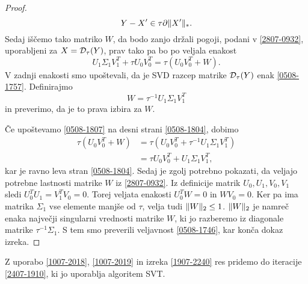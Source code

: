 \begin{proof}
\begin{equation}
    Y- X' \in \tau \partial \lVert X'\rVert_*.
\end{equation}
\fi
Sedaj iščemo tako matriko $W$, da bodo zanjo držali pogoji, podani v \eqref{2807-0932}, uporabljeni za $X=\mathcal{D}_\tau(Y)$, prav tako pa bo po veljala enakost
\begin{equation} \label{0508-1804}
    U_1\Sigma_1V_1^T+\tau U_0 V_0^T
    =
    \tau(U_0V_0^T +W).
\end{equation}
V zadnji enakosti smo upoštevali, da je SVD razcep matrike $\mathcal{D}_\tau(Y)$ enak \eqref{0508-1757}.
Definirajmo
\begin{equation} \label{0508-1807}
    W= \tau^{-1} U_1 \Sigma_1 V_1^T
\end{equation}
in preverimo, da je to prava izbira za $W$.
\iffalse
Veljavnost željene enakosti
preverimo s kratkima računoma:
\begin{align*}
    Y-X' &= U_0\Sigma_0V_0^T + U_1\Sigma_1V_1^T - U_0(\Sigma_0 - \tau I)V_0^T \\ 
    &= U_0(\Sigma_0 - \Sigma_0 + \tau I)V_0^T + U_1\Sigma_1 V_1^T  \\
    &= \tau U_0 V_0^T + U_1\Sigma_1 V_1^T
\end{align*}
in 
\fi
Če upoštevamo \eqref{0508-1807} na desni strani \eqref{0508-1804}, dobimo
\begin{align*}
    \tau(U_0 V_0^T + W) &= \tau(U_0V_0^T + \tau^{-1} U_1 \Sigma_1 V_1^T)\\ 
    &= \tau U_0 V_0^T + U_1 \Sigma_1 V_1^T, 
\end{align*}
kar je ravno leva stran \eqref{0508-1804}.
Sedaj je zgolj potrebno pokazati, da veljajo potrebne lastnosti matrike $W$ iz \eqref{2807-0932}. 
Iz definicije matrik $U_0,U_1,V_0,V_1$ sledi $U_0^T U_1=V_1^TV_0=0$. Torej veljata enakosti $U_0^TW = 0$ in $WV_0 = 0$. Ker pa ima matrika $\Sigma_1$ vse elemente manjše od $\tau$, velja tudi $\lVert W\rVert_2 \leq 1$. $\lVert W\rVert_2$ je namreč enaka največji singularni vrednosti matrike $W$, ki jo razberemo iz diagonale matrike $\tau^{-1}\Sigma_1$. S tem smo preverili veljavnost \eqref{0508-1746}, kar konča dokaz izreka.
\end{proof}

Z uporabo \eqref{1007-2018}, \eqref{1007-2019}
in izreka \ref{1907-2240}
res pridemo do iteracije
\eqref{2407-1910}, ki jo uporablja algoritem SVT.
\iffalse
Tako res pridemo 
Po trditvi lahko sedaj zapišemo algoritem \eqref{1007-2018} - \eqref{1007-2019} kot \cite{CCS}
\[
    \begin{cases}
        X^k = \shrink_\tau(Y^{k-1}) \\
        Y^k = Y^{k-1} + \delta_k \proj(M - X^k) 
    \end{cases}
\]
\fi

